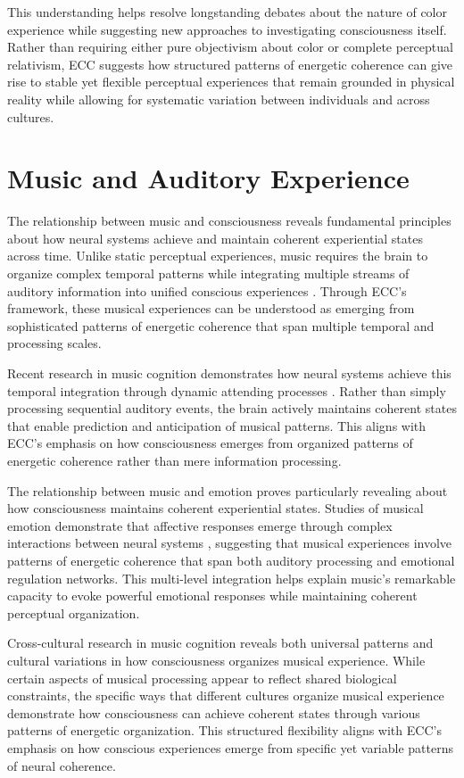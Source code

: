 \begin{refsection}
This understanding helps resolve longstanding debates about the nature of color experience while suggesting new approaches to investigating consciousness itself. Rather than requiring either pure objectivism about color or complete perceptual relativism, ECC suggests how structured patterns of energetic coherence can give rise to stable yet flexible perceptual experiences that remain grounded in physical reality while allowing for systematic variation between individuals and across cultures.

\section{Music and Auditory Experience}

The relationship between music and consciousness reveals fundamental principles about how neural systems achieve and maintain coherent experiential states across time. Unlike static perceptual experiences, music requires the brain to organize complex temporal patterns while integrating multiple streams of auditory information into unified conscious experiences \cite{Janata2002}. Through ECC's framework, these musical experiences can be understood as emerging from sophisticated patterns of energetic coherence that span multiple temporal and processing scales.

Recent research in music cognition demonstrates how neural systems achieve this temporal integration through dynamic attending processes \cite{Large1999}. Rather than simply processing sequential auditory events, the brain actively maintains coherent states that enable prediction and anticipation of musical patterns. This aligns with ECC's emphasis on how consciousness emerges from organized patterns of energetic coherence rather than mere information processing.

The relationship between music and emotion proves particularly revealing about how consciousness maintains coherent experiential states. Studies of musical emotion demonstrate that affective responses emerge through complex interactions between neural systems \cite{Thompson2010}, suggesting that musical experiences involve patterns of energetic coherence that span both auditory processing and emotional regulation networks. This multi-level integration helps explain music's remarkable capacity to evoke powerful emotional responses while maintaining coherent perceptual organization.

Cross-cultural research in music cognition \cite{Patel2010} reveals both universal patterns and cultural variations in how consciousness organizes musical experience. While certain aspects of musical processing appear to reflect shared biological constraints, the specific ways that different cultures organize musical experience demonstrate how consciousness can achieve coherent states through various patterns of energetic organization. This structured flexibility aligns with ECC's emphasis on how conscious experiences emerge from specific yet variable patterns of neural coherence.


\end{refsection}
